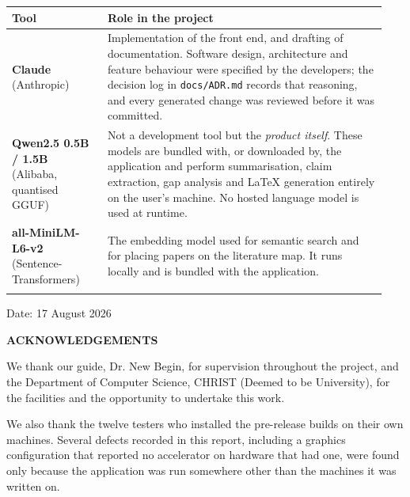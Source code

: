 \documentclass[12pt,a4paper]{report}
\begin{document}
\vspace{0.5cm}
\begin{longtable}{@{}p{0.24\linewidth}p{0.70\linewidth}@{}}
\toprule
\textbf{Tool} & \textbf{Role in the project} \\
\midrule
\endhead

\textbf{Claude} (Anthropic) &
Implementation of the front end, and drafting of documentation. Software
design, architecture and feature behaviour were specified by the developers;
the decision log in \texttt{docs/ADR.md} records that reasoning, and every
generated change was reviewed before it was committed. \\
\addlinespace

\textbf{Qwen2.5 0.5B / 1.5B} (Alibaba, quantised GGUF) &
Not a development tool but the \emph{product itself}. These models are bundled
with, or downloaded by, the application and perform summarisation, claim
extraction, gap analysis and \LaTeX{} generation entirely on the user's
machine. No hosted language model is used at runtime. \\
\addlinespace

\textbf{all-MiniLM-L6-v2} (Sentence-Transformers) &
The embedding model used for semantic search and for placing papers on the
literature map. It runs locally and is bundled with the application. \\
\addlinespace

\bottomrule
\end{longtable}

\vspace{1cm}
\noindent Date: 17 August 2026
\clearpage

\thispagestyle{empty}
\begin{center}{\Large\bfseries ACKNOWLEDGEMENTS}\end{center}
\vspace{0.8cm}

We thank our guide, Dr. New Begin, for supervision throughout the project, and
the Department of Computer Science, CHRIST (Deemed to be University), for the
facilities and the opportunity to undertake this work.

We also thank the twelve testers who installed the pre-release builds on their
own machines. Several defects recorded in this report, including a graphics
configuration that reported no accelerator on hardware that had one, were
found only because the application was run somewhere other than the machines it
was written on.
\end{document}
